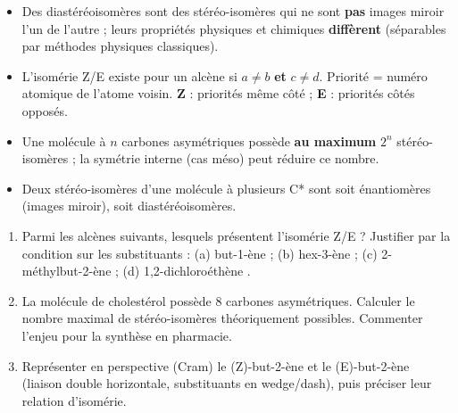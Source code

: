 \documentclass[11pt]{article}
\newcommand{\cle}[1]{{\popxbold\color{popdark}#1}}
\begin{document}
\begin{aretenir}
\begin{itemize}
\item Des \cle{diastéréoisomères} sont des stéréo-isomères qui ne sont \textbf{pas} images miroir l'un de l'autre ; leurs propriétés physiques et chimiques \textbf{diffèrent} (séparables par méthodes physiques classiques).
\item L'isomérie \cle{Z/E} existe pour un alcène  si $a \neq b$ \textbf{et} $c \neq d$. Priorité = numéro atomique de l'atome voisin. \textbf{Z} : priorités même côté ; \textbf{E} : priorités côtés opposés.
\item Une molécule à $n$ carbones asymétriques possède \textbf{au maximum} $2^{n}$ stéréo-isomères ; la symétrie interne (cas méso) peut réduire ce nombre.
\item Deux stéréo-isomères d'une molécule à plusieurs C* sont soit énantiomères (images miroir), soit diastéréoisomères.
\end{itemize}
\end{aretenir}

\begin{exercice}
\begin{enumerate}
\item Parmi les alcènes suivants, lesquels présentent l'isomérie Z/E ? Justifier par la condition sur les substituants : (a) but-1-ène ; (b) hex-3-ène ; (c) 2-méthylbut-2-ène ; (d) 1,2-dichloroéthène .
\item La molécule de cholestérol possède 8 carbones asymétriques. Calculer le nombre maximal de stéréo-isomères théoriquement possibles. Commenter l'enjeu pour la synthèse en pharmacie.
\item Représenter en perspective (Cram) le (Z)-but-2-ène et le (E)-but-2-ène (liaison double horizontale, substituants en wedge/dash), puis préciser leur relation d'isomérie.
\end{enumerate}
\end{exercice}
\end{document}
